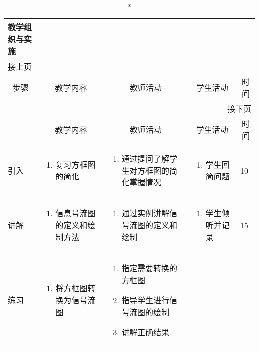 {%
\begin{landscape}

\begin{longtable}{|m{10mm}|m{50mm}|m{50mm}|m{50mm}|m{15mm}|}
\caption*{\huge 教学组织与实施}\\
\hline
\endfirsthead
\multicolumn{5}{l}{\small 接上页}\\
\hline
\multicolumn{1}{|c|}{步骤}&\multicolumn{1}{c|}{教学内容}&\multicolumn{1}{c|}{教师活动}&\multicolumn{1}{c|}{学生活动}&\multicolumn{1}{c|}{时间}\\
\hline
\endhead

\multicolumn{5}{r}{\small 接下页}\\
\endfoot
\hline
\endlastfoot
\multicolumn{1}{|c|}{步骤}&\multicolumn{1}{c|}{教学内容}&\multicolumn{1}{c|}{教师活动}&\multicolumn{1}{c|}{学生活动}&\multicolumn{1}{c|}{时间}\\\hline
引入&\begin{enumerate}
\item 复习方框图的简化
\end{enumerate} &\begin{enumerate}
\item 通过提问了解学生对方框图的简化掌握情况
\end{enumerate} &\begin{enumerate}
\item 学生回简问题
\end{enumerate} &10 \\\hline
讲解&\begin{enumerate}
\item 信息号流图的定义和绘制方法
\end{enumerate}
 &\begin{enumerate}
\item 通过实例讲解信号流图的定义和绘制
\end{enumerate} &\begin{enumerate}
\item 学生倾听并记录
\end{enumerate} &15 \\\hline
练习&\begin{enumerate}
\item 将方框图转换为信号流图
\end{enumerate}
&\begin{enumerate}
\item 指定需要转换的方框图
\item 指导学生进行信号流图的绘制
\item 讲解正确结果

\end{enumerate}
\end{longtable}
\end{landscape}}
